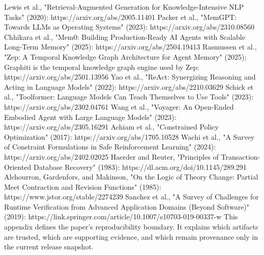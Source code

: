 {}\markdownRendererUlBeginTight
\markdownRendererUlItem Lewis et al., "Retrieval-Augmented Generation for Knowledge-Intensive NLP Tasks" (2020): https://arxiv.org/abs/2005.11401\markdownRendererUlItemEnd 
\markdownRendererUlItem Packer et al., "MemGPT: Towards LLMs as Operating Systems" (2023): https://arxiv.org/abs/2310.08560\markdownRendererUlItemEnd 
\markdownRendererUlItem Chhikara et al., "Mem0: Building Production-Ready AI Agents with Scalable Long-Term Memory" (2025): https://arxiv.org/abs/2504.19413\markdownRendererUlItemEnd 
\markdownRendererUlItem Rasmussen et al., "Zep: A Temporal Knowledge Graph Architecture for Agent Memory" (2025); Graphiti is the temporal knowledge graph engine used by Zep: https://arxiv.org/abs/2501.13956\markdownRendererUlItemEnd 
\markdownRendererUlItem Yao et al., "ReAct: Synergizing Reasoning and Acting in Language Models" (2022): https://arxiv.org/abs/2210.03629\markdownRendererUlItemEnd 
\markdownRendererUlItem Schick et al., "Toolformer: Language Models Can Teach Themselves to Use Tools" (2023): https://arxiv.org/abs/2302.04761\markdownRendererUlItemEnd 
\markdownRendererUlItem Wang et al., "Voyager: An Open-Ended Embodied Agent with Large Language Models" (2023): https://arxiv.org/abs/2305.16291\markdownRendererUlItemEnd 
\markdownRendererUlItem Achiam et al., "Constrained Policy Optimization" (2017): https://arxiv.org/abs/1705.10528\markdownRendererUlItemEnd 
\markdownRendererUlItem Wachi et al., "A Survey of Constraint Formulations in Safe Reinforcement Learning" (2024): https://arxiv.org/abs/2402.02025\markdownRendererUlItemEnd 
\markdownRendererUlItem Haerder and Reuter, "Principles of Transaction-Oriented Database Recovery" (1983): https://dl.acm.org/doi/10.1145/289.291\markdownRendererUlItemEnd 
\markdownRendererUlItem Alchourron, Gardenfors, and Makinson, "On the Logic of Theory Change: Partial Meet Contraction and Revision Functions" (1985): https://www.jstor.org/stable/2274239\markdownRendererUlItemEnd 
\markdownRendererUlItem Sanchez et al., "A Survey of Challenges for Runtime Verification from Advanced Application Domains (Beyond Software)" (2019): https://link.springer.com/article/10.1007/s10703-019-00337-w\markdownRendererUlItemEnd 
\markdownRendererUlEndTight \markdownRendererInterblockSeparator
{}
\markdownRendererSectionEnd \markdownRendererSectionBegin
{}\markdownRendererInterblockSeparator
{}This appendix defines the paper's reproducibility boundary.\markdownRendererSoftLineBreak
{}It explains which artifacts are trusted, which are supporting evidence, and which remain provenance only in the current release snapshot.\markdownRendererInterblockSeparator
